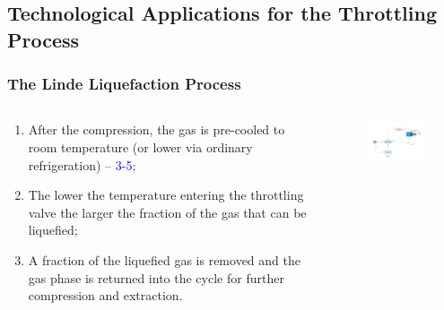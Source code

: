 \documentclass[10pt,compress]{beamer}
\begin{document}
\subsection{Technological Applications for the Throttling Process}
\begin{frame}
 \frametitle{The Linde Liquefaction Process}
  \begin{columns}
   \begin{column}[c]{0.45\linewidth}
  \begin{enumerate}[(1)]
   \item <1-> After the compression, the gas is pre-cooled to room temperature (or lower via ordinary refrigeration) -- \textcolor{blue}{3-5};
   \item <2-> The lower the temperature entering the throttling valve the larger the fraction of the gas that can be liquefied; 
   \item <3-> A fraction of the liquefied gas is removed and the gas phase is returned into the cycle for further compression and extraction.
  \end{enumerate}
   \end{column}
   \begin{column}[c]{0.55\linewidth}
    \begin{figure}%
     \begin{center}
      \includegraphics[width=6.5cm,clip]{./Pics/Overview_Refrig39}
     \end{center}
    \end{figure}  
   \end{column}  
  \end{columns}
\end{frame}
\end{document}
